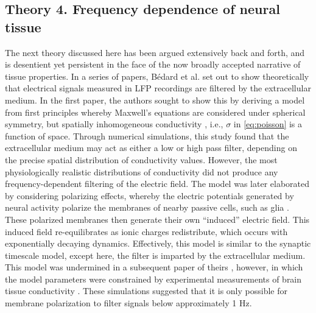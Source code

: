 \subsection{Theory 4. Frequency dependence of neural tissue} \label{sec:filter_theory}
The next theory discussed here has been argued extensively back and forth, and is desentient yet persistent in the face of the now broadly accepted narrative of tissue properties. In a series of papers, Bédard et al.\cite{Bedard2004, Bedard2006a, Bedard2009} set out to show theoretically that electrical signals measured in LFP recordings are filtered by the extracellular medium. In the first paper, the authors sought to show this by deriving a model from first principles whereby Maxwell’s equations are considered under spherical symmetry, but spatially inhomogeneous conductivity \cite{Bedard2004}, i.e., $\sigma$ in \ref{eq:poisson} is a function of space. Through numerical simulations, this study found that the extracellular medium may act as either a low or high pass filter, depending on the precise spatial distribution of conductivity values. However, the most physiologically realistic distributions of conductivity did not produce any frequency-dependent filtering of the electric field. The model was later elaborated by considering polarizing effects, whereby the electric potentials generated by neural activity polarize the membranes of nearby passive cells, such as glia \cite{Bedard2006a}. These polarized membranes then generate their own ``induced'' electric field. This induced field re-equilibrates as ionic charges redistribute, which occurs with exponentially decaying dynamics. Effectively, this model is similar to the synaptic timescale model, except here, the filter is imparted by the extracellular medium. This model was undermined in a subsequent paper of theirs \cite{Bedard2009}, however, in which the model parameters were constrained by experimental measurements of brain tissue conductivity \cite{Gabriel1996}. These simulations suggested that it is only possible for membrane polarization to filter signals below approximately 1 Hz.

